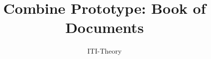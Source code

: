 \documentclass[11pt]{combine}
\title{Combine Prototype: Book of Documents}
\author{ITI-Theory}
\begin{document}
\pagestyle{combine}
\maketitle
\tableofcontents
\begin{papers}[]


\end{papers}
\end{document}
